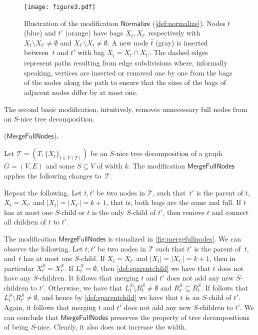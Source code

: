 \documentclass[a4paper,UKenglish,cleveref, autoref, thm-restate, numberwithinsect]{lipics-v2021}
\newcounter{modification}
\newenvironment{modification}[1][]{\refstepcounter{modification}\renewcommand{\arraystretch}{.6}
\begin{center}
\begin{mdframed}[nobreak=true]{\normalsize\sffamily{\bfseries Modification~\themodification} (#1){\bfseries .}}

\vspace{.5ex}
\begin{normalsize}
}
{
\end{normalsize}
\end{mdframed}
\end{center}
}
\newcommand{\Normalize}{\mathsf{Normalize}}
\newcommand{\MergeFullNodes}{\mathsf{MergeFullNodes}}
\begin{document}
\begin{figure}[t]
\centering
\texttt{[image: figure3.pdf]}
    \caption{Illustration of the modification $\Normalize$ (\cref{def:normalize}). Nodes $t$ (blue) and $t'$ (orange) have bags $X_t, X_{t'}$ respectively with $X_t\setminus X_{t'}\neq \emptyset$ and $X_{t'}\setminus X_{t}\neq \emptyset$. A new node $\hat{t}$ (gray) is inserted between~$t$ and $t'$ with bag $X_{\hat{t}}=X_t\cap X_{t'}$. The dashed edges represent paths resulting from edge subdivisions where, informally speaking, vertices are inserted or removed one by one from the bags of the nodes along the path to ensure that the sizes of the bags of adjacent nodes differ by at most one.}\label{fig:normalize}
\end{figure}


The second basic modification, intuitively, removes unnecessary full nodes from an $S$-nice tree decomposition.

\begin{modification}[$\MergeFullNodes$]\label{def:mergefullnodes}
Let $\mathcal{T}=(T,\{X_t\}_{t\in V(T)})$ be an $S$-nice tree decomposition of a graph $G=(V,E)$ and some $S\subseteq V$ of width $k$. The modification $\MergeFullNodes$ applies the following changes to~$\mathcal{T}$.

Repeat the following. Let $t,t'$ be two nodes in $\mathcal{T}$, such that~$t'$ is the parent of $t$, $X_t=X_{t'}$ and $|X_t|=|X_{t'}|=k+1$, that is, both bags are the same and full. If $t$ has at most one $S$-child or $t$ is the only $S$-child of $t'$, then remove $t$ and connect all children of $t$ to $t'$.
\end{modification}

The modification $\MergeFullNodes$ is visualized in \cref{fig:mergefullnodes}. We can observe the following. Let $t,t'$ be two nodes in $\mathcal{T}$ such that $t'$ is the parent of~$t$, and~$t$ has at most one $S$-child. 
If $X_t=X_{t'}$ and $|X_t|=|X_{t'}|=k+1$, then in particular $X^S_t=X^S_{t'}$.
If $L^S_t=\emptyset$, then \cref{def:sparentchild} we have that $t$ does not have any $S$-children. It follows that merging $t$ and $t'$ does not add any new $S$-children to $t'$. Otherwise, we have that $L^S_{t}\setminus R^S_{t}\neq\emptyset$ and $R^S_{t'}\subseteq R^S_{t}$. If follows that $L^S_t\setminus R^S_{t'}\neq\emptyset$, and hence by \cref{def:sparentchild} we have that $t$ is an $S$-child of $t'$. Again, it follows that merging $t$ and $t'$ does not add any new $S$-children to $t'$. 
We can conclude that $\MergeFullNodes$ preserves the property of tree decompositions of being $S$-nice. Clearly, it also does not increase the width.
\end{document}
